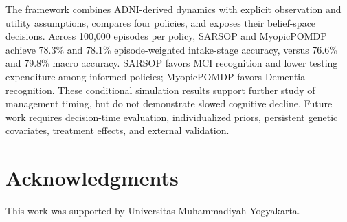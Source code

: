 \documentclass[conference,a4paper]{IEEEtran}
\begin{document}
The framework combines ADNI-derived dynamics with explicit observation
and utility assumptions, compares four policies, and exposes their
belief-space decisions. Across 100,000 episodes per policy, SARSOP
and MyopicPOMDP achieve 78.3\% and 78.1\% episode-weighted
intake-stage accuracy, versus 76.6\% and 79.8\% macro accuracy.
SARSOP favors MCI recognition and lower testing expenditure among
informed policies; MyopicPOMDP favors Dementia recognition.
These conditional simulation results support further study of
management timing, but do not demonstrate slowed cognitive decline.
Future work requires decision-time evaluation, individualized priors,
persistent genetic covariates, treatment effects, and external validation.

\section*{Acknowledgments}
This work was supported by Universitas Muhammadiyah Yogyakarta.

{\footnotesize


}
\end{document}
